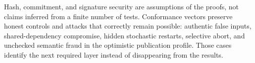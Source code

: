 Hash, commitment, and signature security are assumptions of the proofs, not claims inferred from a finite number of tests. Conformance vectors preserve honest controls and attacks that correctly remain possible: authentic false inputs, shared-dependency compromise, hidden stochastic restarts, selective abort, and unchecked semantic fraud in the optimistic publication profile. Those cases identify the next required layer instead of disappearing from the results.
